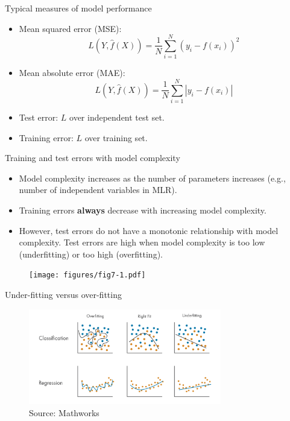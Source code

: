 \documentclass[aspectratio=169]{beamer}
\begin{document}
\begin{frame}{Typical measures of model performance}
    \begin{itemize}
        \item Mean squared error (MSE):
            \begin{equation*}
                L(Y, \hat{f}(X)) = \frac{1}{N}\sum_{i=1}^N (y_i - f(x_i))^2
            \end{equation*}
        \item Mean absolute error (MAE):
            \begin{equation*}
                L(Y, \hat{f}(X)) = \frac{1}{N}\sum_{i=1}^N \left| y_i - f(x_i) \right|
            \end{equation*}
        \item Test error: $L$ over independent test set.
        \item Training error: $L$ over training set.
    \end{itemize}
\end{frame}


\begin{frame}{Training and test errors with model complexity}
    \begin{itemize}
        \item Model complexity increases as the number of parameters increases (e.g., number of independent variables in MLR). 
        \item Training errors \textbf{always} decrease with increasing model complexity.
        \item However, test errors do not have a monotonic relationship with model complexity. Test errors are high when model complexity is too low (underfitting) or too high (overfitting).
    \end{itemize}
    \begin{figure}
        \centering
        \texttt{[image: figures/fig7-1.pdf]}
    \end{figure}
\end{frame}


\begin{frame}{Under-fitting versus over-fitting}
    \begin{figure}
        \centering
        \includegraphics[width=0.75\textwidth]{figures/under_over_fitting.png}
        \caption{Source: Mathworks}
    \end{figure}
\end{frame}
\end{document}
